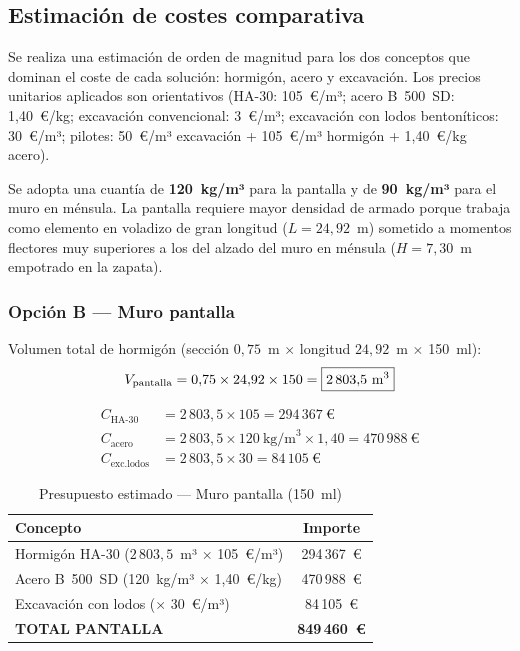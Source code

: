 \subsection{Estimación de costes comparativa}
\label{subsec:costes_comparativa}

Se realiza una estimación de orden de magnitud para los dos conceptos que
dominan el coste de cada solución: hormigón, acero y excavación. Los precios
unitarios aplicados son orientativos (HA-30: 105~€/m³; acero B~500~SD: 1{,}40~€/kg;
excavación convencional: 3~€/m³; excavación con lodos bentoníticos: 30~€/m³;
pilotes: 50~€/m³ excavación + 105~€/m³ hormigón + 1{,}40~€/kg acero).

\begin{notabox}
  Se adopta una cuantía de \textbf{120~kg/m³} para la pantalla y de
  \textbf{90~kg/m³} para el muro en ménsula. La pantalla requiere mayor
  densidad de armado porque trabaja como elemento en voladizo de gran longitud
  ($L = 24{,}92$~m) sometido a momentos flectores muy superiores a los del alzado
  del muro en ménsula ($H = 7{,}30$~m empotrado en la zapata).
\end{notabox}

\subsubsection{Opción B — Muro pantalla}

Volumen total de hormigón (sección $0{,}75$~m $\times$ longitud $24{,}92$~m $\times$ 150~ml):
\[
  V_\text{pantalla} = 0{,}75 \times 24{,}92 \times 150 = \boxed{2\,803{,}5~\text{m}^3}
\]

\begin{align*}
  C_\text{HA-30}     &= 2\,803{,}5 \times 105 = 294\,367~\text{€} \\
  C_\text{acero}     &= 2\,803{,}5 \times 120~\text{kg/m}^3 \times 1{,}40
                     = 470\,988~\text{€} \\
  C_\text{exc.lodos} &= 2\,803{,}5 \times 30 = 84\,105~\text{€}
\end{align*}

\begin{table}[H]
  \centering
  \caption{Presupuesto estimado — Muro pantalla (150~ml)}
  \label{tab:presup_pantalla}
  \begin{tabular}{@{}lc@{}}
    \toprule
    \textbf{Concepto} & \textbf{Importe} \\
    \midrule
    Hormigón HA-30 ($2\,803{,}5$~m³ $\times$ 105~€/m³)   & 294\,367~€ \\
    Acero B~500~SD (120~kg/m³ $\times$ 1{,}40~€/kg)       & 470\,988~€ \\
    Excavación con lodos ($\times$ 30~€/m³)                &  84\,105~€ \\
    \midrule
    \textbf{TOTAL PANTALLA}                                & \textbf{849\,460~€} \\
    \bottomrule
  \end{tabular}
\end{table}


